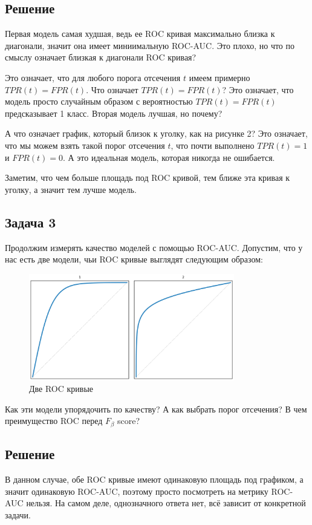 \subsection*{Решение}
Первая модель самая худшая, ведь ее ROC кривая максимально близка к диагонали, значит она имеет миниимальную ROC-AUC.
Это плохо, но что по смыслу означает близкая к диагонали ROC кривая?

Это означает, что для любого порога отсечения $t$ имеем примерно $TPR(t) = FPR(t)$.
Что означает $TPR(t) = FPR(t)$? Это означает, что модель просто случайным образом с вероятностью $TPR(t)=FPR(t)$ предсказывает 1 класс.
Вторая модель лучшая, но почему?

А что означает график, который близок к уголку, как на рисунке 2?
Это означает, что мы можем взять такой порог отсечения $t$, что почти выполнено $TPR(t) = 1$ и $FPR(t) = 0$.
А это идеальная модель, которая никогда не ошибается.

Заметим, что чем больше площадь под ROC кривой, тем ближе эта кривая к уголку, а значит тем лучше модель.

\subsection*{Задача 3}
Продолжим измерять качество моделей с помощью ROC-AUC. Допустим, что у нас есть две модели, чьи ROC кривые выглядят следующим образом:
\begin{figure}[h]
    \centering
    \includegraphics[width=0.8\textwidth]{chapters/feature_selection/roc_curves_comparison_2.png}
    \caption{Две ROC кривые}
\end{figure}
Как эти модели упорядочить по качеству? А как выбрать порог отсечения? В чем преимущество ROC перед $F_{\beta}$ score?

\subsection*{Решение}
В данном случае, обе ROC кривые имеют одинаковую площадь под графиком, а значит одинаковую ROC-AUC, поэтому просто посмотреть на метрику ROC-AUC нельзя.
На самом деле, однозначного ответа нет, всё зависит от конкретной задачи.

